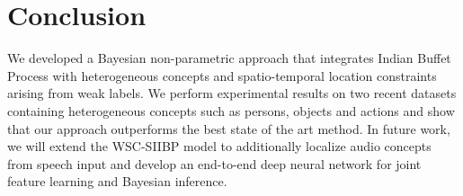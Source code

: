 \documentclass[runningheads]{llncs}
\begin{document}

\section{Conclusion}
We developed a Bayesian non-parametric approach that integrates Indian Buffet Process with heterogeneous concepts and spatio-temporal location constraints arising from weak labels. %
We perform experimental results on two recent datasets containing heterogeneous concepts such as persons, objects and actions and show that our approach outperforms the best state of the art method. In future work, we will extend the WSC-SIIBP model to additionally localize audio concepts from speech input and develop an end-to-end deep neural network for joint feature learning and Bayesian inference.

\renewcommand{\theequation}{S\arabic{equation}}
\end{document}
